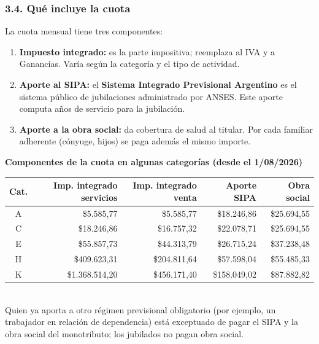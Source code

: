 \subsubsection*{3.4. Qué incluye la cuota}
La cuota mensual tiene tres componentes:
\begin{enumerate}
  \item \textbf{Impuesto integrado:} es la parte impositiva; reemplaza al IVA y a Ganancias.
        Varía según la categoría y el tipo de actividad.
  \item \textbf{Aporte al SIPA:} el \textbf{Sistema Integrado Previsional Argentino} es el
        sistema público de jubilaciones administrado por ANSES. Este aporte computa años de
        servicio para la jubilación.
  \item \textbf{Aporte a la obra social:} da cobertura de salud al titular. Por cada
        familiar adherente (cónyuge, hijos) se paga además el mismo importe.
\end{enumerate}

\begin{center}
\footnotesize
\textbf{Componentes de la cuota en algunas categorías (desde el 1/08/2026)}\\[3pt]
\begin{tabular}{|c|r|r|r|r|}
\hline
\textbf{Cat.} & \textbf{Imp. integrado servicios} & \textbf{Imp. integrado venta} &
\textbf{Aporte SIPA} & \textbf{Obra social} \\ \hline
A & \$5.585,77 & \$5.585,77 & \$18.246,86 & \$25.694,55 \\ \hline
C & \$18.246,86 & \$16.757,32 & \$22.078,71 & \$25.694,55 \\ \hline
E & \$55.857,73 & \$44.313,79 & \$26.715,24 & \$37.238,48 \\ \hline
H & \$409.623,31 & \$204.811,64 & \$57.598,04 & \$55.485,33 \\ \hline
K & \$1.368.514,20 & \$456.171,40 & \$158.049,02 & \$87.882,82 \\ \hline
\end{tabular}\\[2pt]
{\scriptsize Quien ya aporta a otro régimen previsional obligatorio (por ejemplo, un
trabajador en relación de dependencia) está exceptuado de pagar el SIPA y la obra social
del monotributo; los jubilados no pagan obra social.}
\end{center}

